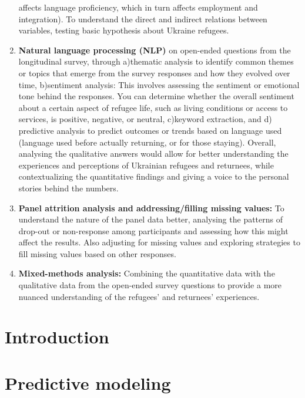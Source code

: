 \documentclass[
  letterpaper,
  DIV=11,
  numbers=noendperiod]{scrreprt}
\begin{document}
\begin{enumerate}
  affects language proficiency, which in turn affects employment and
  integration). To understand the direct and indirect relations between
  variables, testing basic hypothesis about Ukraine refugees.
\item
  \textbf{Natural language processing (NLP)} on open-ended questions
  from the longitudinal survey, through a)thematic analysis to identify
  common themes or topics that emerge from the survey responses and how
  they evolved over time, b)sentiment analysis: This involves assessing
  the sentiment or emotional tone behind the responses. You can
  determine whether the overall sentiment about a certain aspect of
  refugee life, such as living conditions or access to services, is
  positive, negative, or neutral, c)keyword extraction, and d)
  predictive analysis to predict outcomes or trends based on language
  used (language used before actually returning, or for those staying).
  Overall, analysing the qualitative answers would allow for better
  understanding the experiences and perceptions of Ukrainian refugees
  and returnees, while contextualizing the quantitative findings and
  giving a voice to the personal stories behind the numbers.
\item
  \textbf{Panel attrition analysis and addressing/filling missing
  values:} To understand the nature of the panel data better, analysing
  the patterns of drop-out or non-response among participants and
  assessing how this might affect the results. Also adjusting for
  missing values and exploring strategies to fill missing values based
  on other responses.
\item
  \textbf{Mixed-methods analysis:} Combining the quantitative data with
  the qualitative data from the open-ended survey questions to provide a
  more nuanced understanding of the refugees' and returnees'
  experiences.
\end{enumerate}


\chapter{Introduction}\label{introduction}


\chapter{Predictive modeling}\label{predictive-modeling}
\end{document}
